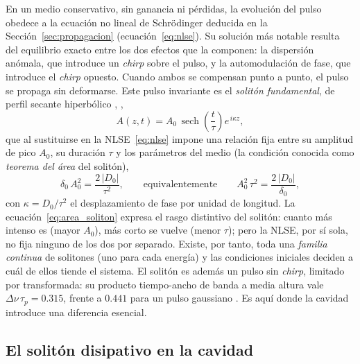 En un medio conservativo, sin ganancia ni pérdidas, la evolución del pulso obedece
a la ecuación no lineal de Schrödinger deducida en la
Sección~\ref{sec:propagacion} (ecuación~\eqref{eq:nlse}). Su solución más notable
resulta del equilibrio exacto entre los dos efectos que la componen: la dispersión
anómala, que introduce un \emph{chirp} sobre el pulso, y la automodulación de fase,
que introduce el \emph{chirp} opuesto. Cuando ambos se compensan punto a punto, el
pulso se propaga sin deformarse. Este pulso invariante es el \emph{solitón
fundamental}, de perfil secante hiperbólico \cite{HasegawaTappert1973},
\cite[sec.~4.3]{Keller2022},
%
\begin{equation}
    A(z,t) = A_0\,\operatorname{sech}\!\left(\frac{t}{\tau}\right)
    e^{\,i\kappa z},
    \label{eq:soliton_fundamental}
\end{equation}
%
que al sustituirse en la NLSE~\eqref{eq:nlse} impone una relación fija entre su
amplitud de pico $A_0$, su duración $\tau$ y los parámetros del medio (la condición
conocida como \emph{teorema del área} del solitón),
%
\begin{equation}
    \delta_0\,A_0^{2} = \frac{2\,|D_0|}{\tau^{2}},
    \qquad\text{equivalentemente}\qquad
    A_0^{2}\,\tau^{2} = \frac{2\,|D_0|}{\delta_0},
    \label{eq:area_soliton}
\end{equation}
%
con $\kappa = D_0/\tau^2$ el desplazamiento de fase por unidad de longitud. La
ecuación~\eqref{eq:area_soliton} expresa el rasgo distintivo del solitón: cuanto
más intenso es (mayor $A_0$), más corto se vuelve (menor $\tau$); pero la NLSE, por
sí sola, no fija ninguno de los dos por separado. Existe, por tanto, toda una
\emph{familia continua} de solitones (uno para cada energía) y las condiciones
iniciales deciden a cuál de ellos tiende el sistema.
El solitón es además un pulso sin \emph{chirp}, limitado por transformada: su producto
tiempo-ancho de banda a media altura vale $\Delta\nu\,\tau_p=0.315$, frente a $0.441$
para un pulso gaussiano \cite[Tabla~2.1]{Keller2022}. Es aquí donde la cavidad
introduce una diferencia esencial.

\subsection{El solitón disipativo en la cavidad}
\label{sec:soliton_disipativo}

